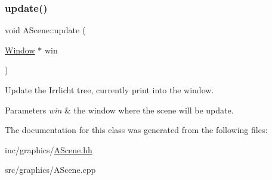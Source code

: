 \subsubsection{\texorpdfstring{update()}{update()}}
{\footnotesize\ttfamily void A\+Scene\+::update (\begin{DoxyParamCaption}\item[{\hyperlink{classWindow}{Window} $\ast$}]{win }\end{DoxyParamCaption})}



Update the Irrlicht tree, currently print into the window. 


\begin{DoxyParams}{Parameters}
{\em \textquotesingle{}win\textquotesingle{}} & the window where the scene will be update. \\
\hline
\end{DoxyParams}


The documentation for this class was generated from the following files\+:\begin{DoxyCompactItemize}
\item 
inc/graphics/\hyperlink{AScene_8hh}{A\+Scene.\+hh}\item 
src/graphics/A\+Scene.\+cpp\end{DoxyCompactItemize}
